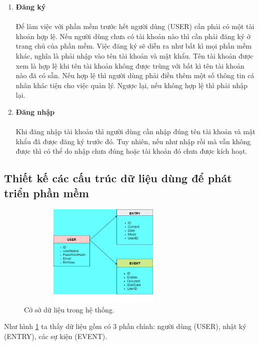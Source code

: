 \documentclass[a4paper]{article}
\begin{document}
	\begin{enumerate}
		\item \textbf{Đăng ký} \\\\
			Để làm việc với phần mềm trước hết người dùng (USER) cần phải có một tài khoản hợp lệ. Nếu người dùng chưa có tài khoản nào thì cần phải đăng ký ở trang chủ của phần mềm. Việc đăng ký sẽ diễn ra như bất kì mọi phần mềm khác, nghĩa là phải nhập vào tên tài khoản và mật khẩu. Tên tài khoản được xem là hợp lệ khi tên tài khoản không được trùng với bất kì tên tài khoản nào đă có sẵn. Nếu hợp lệ thì người dùng phải điền thêm một số thông tin cá nhân khác tiện cho việc quản lý. Ngược lại, nếu không hợp lệ thì phải nhập lại.
		\item \textbf{Đăng nhập} \\\\
		Khi đăng nhập tài khoản thì người dùng cần nhập đúng tên tài khoản và mật khẩu đã được đăng ký trước đó. Tuy nhiên, nếu như nhập rồi mà vẫn không được thì có thể do nhập chưa đúng hoặc tài khoản đó chưa được kích hoạt.

	\end{enumerate}


\subsection{Thiết kế các cấu trúc dữ liệu dùng để phát triển phần mềm}

\begin{figure}[!h]
	  \centering
      \includegraphics[height=140pt,width=240pt]{Images/h1.png}
	  \caption{Cở sở dữ liệu trong hệ thống.}
	  \label{mainbook1}
	 \end{figure}


Như hình \ref{mainbook1} ta thấy dữ liệu gồm có 3 phần chính: người dùng (USER), nhật ký (ENTRY), các sự kiện (EVENT).
\end{document}
